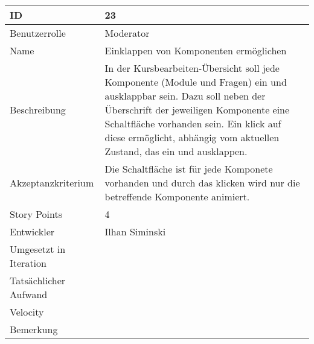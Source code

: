 \begin{tabularx}{\textwidth}{|p{}|X|}
	\hline
	ID & 23\\
	\hline
	Benutzerrolle & Moderator\\
	\hline
	Name & Einklappen von Komponenten ermöglichen\\
	\hline
	Beschreibung & In der Kursbearbeiten-Übersicht soll jede Komponente (Module und Fragen) ein und ausklappbar sein.
		Dazu soll neben der Überschrift der jeweiligen Komponente eine Schaltfläche vorhanden sein.
		Ein klick auf diese ermöglicht, abhängig vom aktuellen Zustand, das ein und ausklappen. \\
	\hline
	Akzeptanzkriterium & Die Schaltfläche ist für jede Komponete vorhanden und durch das klicken wird nur die betreffende Komponente animiert.\\
	\hline
	Story Points & 4 \\
	\hline
	Entwickler & Ilhan Siminski\\
	\hline
	Umgesetzt in Iteration & \\
	\hline
	Tatsächlicher Aufwand & \\
	\hline
	Velocity & \\
	\hline
	Bemerkung & \\
	\hline
\end{tabularx}
\vspace{20pt}
